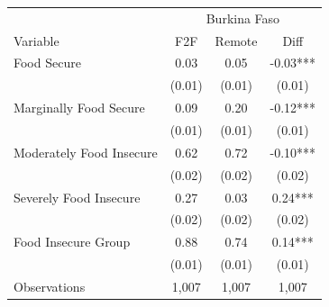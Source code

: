 \begin{tabular}{l*{3}c}
\hline\hline
 & \multicolumn{3}{c}{Burkina Faso}\\ 
Variable & F2F & Remote & Diff \\
\hline
Food Secure&0.03&0.05&-0.03***\\
&(0.01)&(0.01)&(0.01)\\
Marginally Food Secure&0.09&0.20&-0.12***\\
&(0.01)&(0.01)&(0.01)\\
Moderately Food Insecure&0.62&0.72&-0.10***\\
&(0.02)&(0.02)&(0.02)\\
Severely Food Insecure&0.27&0.03&0.24***\\
&(0.02)&(0.02)&(0.02)\\
Food Insecure Group&0.88&0.74&0.14***\\
&(0.01)&(0.01)&(0.01)\\
\hline
Observations & 1,007 & 1,007 & 1,007 \\
\hline\hline
\end{tabular}
